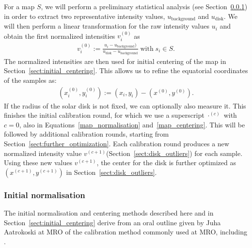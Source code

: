 \documentclass{aa}
\newcommand{\skk}[1]{\textcolor{midorange}{[SKK: #1]}} %
\newcommand{\eqnl}[2]{\begin{eqnarray}\label{#1}#2\end{eqnarray}}
\newcommand{\s}[2]{{#1}_{\mathrm{#2}}}
\begin{document}
  For a map $S$, we will perform a preliminary statistical analysis (see Section~\ref{sect:s_curve}) in order to extract 
  two representative intensity values, $\s{u}{background}$ and $\s{u}{disk}$. We will then perform a linear 
  transformation for the raw intensity values $u_i$ and obtain the first normalized intensities $v_i^{(0)}$ as
  \eqnl{map_normalisation}{
  v_i^{(0)} := \frac{u_i - \s{u}{background})}{\s{u}{disk} - \s{u}{background}} \; \text{with} \; s_i \in S \text{.}
  }
  The normalized intensities are then used for initial centering of the map in Section~\ref{sect:initial_centering}. 
  This allows us to refine the equatorial coordinates of the samples as:
  \eqnl{map_centering}{
  \left( x_i^{(0)}, y_i^{(0)} \right) := \left( x_i, y_i \right) - \left( x^{(0)}, y^{(0)} \right) \text{.}
  }
  If the radius of the solar disk is not fixed, we can optionally also measure it. This finishes the initial calibration 
  round, for which we use a superscript $\cdot^{(c)}$ with $c=0$, also in Equations~\ref{map_normalisation} 
  and~\ref{map_centering}. This will be followed by additional calibration rounds, starting from 
  Section~\ref{sect:further_optimization}. Each calibration round produces a new normalized intensity value 
  $v^{(c+1)}$(Section~\ref{sect:disk_outliers}) for each sample. Using these new values $v^{(c+1)}$, the center for the 
  disk is further optimized as $(x^{(c+1)}, y^{(c+1)})$ in Section~\ref{sect:disk_outliers}.

  
  \subsubsection{Initial normalisation}\label{sect:s_curve}

  The initial normalisation and centering methods described here and in Section~\ref{sect:initial_centering} derive from 
  an oral outline given by Juha Aatrokoski at MRO of the calibration method commonly used at MRO, including 
  \citet{metsahovi40}.
\end{document}
